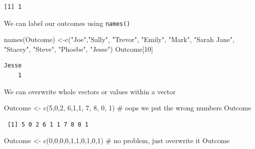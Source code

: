 \documentclass[
  letterpaper,
  DIV=11,
  numbers=noendperiod]{scrreprt}
\newenvironment{Shaded}{\begin{snugshade}}{\end{snugshade}}
\newcommand{\CommentTok}[1]{\textcolor[rgb]{0.37,0.37,0.37}{#1}}
\newcommand{\DecValTok}[1]{\textcolor[rgb]{0.68,0.00,0.00}{#1}}
\newcommand{\FunctionTok}[1]{\textcolor[rgb]{0.28,0.35,0.67}{#1}}
\newcommand{\NormalTok}[1]{\textcolor[rgb]{0.00,0.23,0.31}{#1}}
\newcommand{\OtherTok}[1]{\textcolor[rgb]{0.00,0.23,0.31}{#1}}
\newcommand{\StringTok}[1]{\textcolor[rgb]{0.13,0.47,0.30}{#1}}
\begin{document}
\begin{verbatim}
[1] 1
\end{verbatim}

We can label our outcomes using \texttt{names()}

\begin{Shaded}
\begin{Highlighting}[]
\FunctionTok{names}\NormalTok{(Outcome) }\OtherTok{\textless{}{-}}\FunctionTok{c}\NormalTok{(}\StringTok{"Joe"}\NormalTok{,}\StringTok{"Sally"}\NormalTok{, }\StringTok{"Trevor"}\NormalTok{, }\StringTok{"Emily"}\NormalTok{, }\StringTok{"Mark"}\NormalTok{,}
                   \StringTok{"Sarah Jane"}\NormalTok{, }\StringTok{"Stacey"}\NormalTok{, }\StringTok{"Steve"}\NormalTok{, }\StringTok{"Phoebe"}\NormalTok{, }\StringTok{"Jesse"}\NormalTok{)}
\NormalTok{Outcome[}\DecValTok{10}\NormalTok{]}
\end{Highlighting}
\end{Shaded}

\begin{verbatim}
Jesse 
    1 
\end{verbatim}

We can overwrite whole vectors or values within a vector

\begin{Shaded}
\begin{Highlighting}[]
\NormalTok{Outcome }\OtherTok{\textless{}{-}} \FunctionTok{c}\NormalTok{(}\DecValTok{5}\NormalTok{,}\DecValTok{0}\NormalTok{,}\DecValTok{2}\NormalTok{, }\DecValTok{6}\NormalTok{,}\DecValTok{1}\NormalTok{,}\DecValTok{1}\NormalTok{, }\DecValTok{7}\NormalTok{, }\DecValTok{8}\NormalTok{, }\DecValTok{0}\NormalTok{, }\DecValTok{1}\NormalTok{) }\CommentTok{\# oops we put the wrong numbers}
\NormalTok{Outcome}
\end{Highlighting}
\end{Shaded}

\begin{verbatim}
 [1] 5 0 2 6 1 1 7 8 0 1
\end{verbatim}

\begin{Shaded}
\begin{Highlighting}[]
\NormalTok{Outcome }\OtherTok{\textless{}{-}} \FunctionTok{c}\NormalTok{(}\DecValTok{0}\NormalTok{,}\DecValTok{0}\NormalTok{,}\DecValTok{0}\NormalTok{,}\DecValTok{0}\NormalTok{,}\DecValTok{1}\NormalTok{,}\DecValTok{1}\NormalTok{,}\DecValTok{0}\NormalTok{,}\DecValTok{1}\NormalTok{,}\DecValTok{0}\NormalTok{,}\DecValTok{1}\NormalTok{) }\CommentTok{\# no problem, just overwrite it}
\NormalTok{Outcome}
\end{Highlighting}
\end{Shaded}
\end{document}
